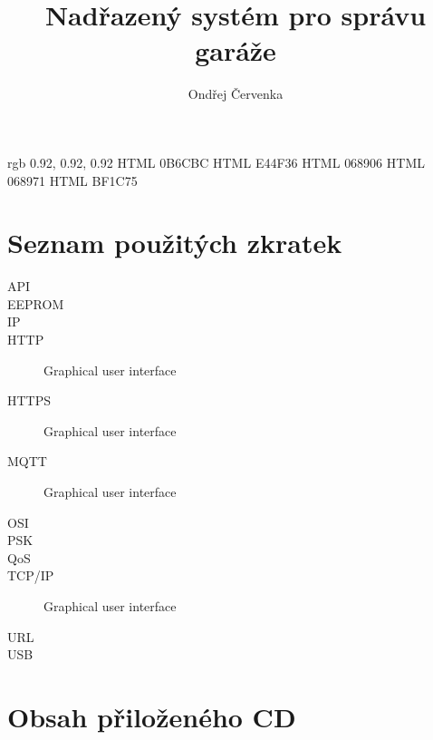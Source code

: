 \documentclass[thesis=M,czech]{templates/FITthesis}[2012/06/26]
\title{Nadřazený systém pro správu garáže}
\author{Ondřej Červenka} %
\begin{document}
\definecolor {codebg} {rgb} {0.92, 0.92, 0.92}
\definecolor {blue} {HTML} {0B6CBC}
\definecolor {red} {HTML} {E44F36}
\definecolor {green} {HTML} {068906}
\definecolor {cyan} {HTML} {068971}
\definecolor {magenta} {HTML} {BF1C75}


\begin{introduction}
	
\end{introduction}







\begin{conclusion}
\end{conclusion}




\appendix

\chapter{Seznam použitých zkratek}
\begin{description}
	\item[API]
    \item[EEPROM]
    \item[IP]
	\item[HTTP] Graphical user interface
    \item[HTTPS] Graphical user interface
    \item[MQTT] Graphical user interface
    \item[OSI]
    \item[PSK]
    \item[QoS]
    \item[TCP/IP] Graphical user interface
    \item[URL]
    \item[USB]
\end{description}

\chapter{Obsah přiloženého CD}

\begin{figure}
\end{figure}
\end{document}
